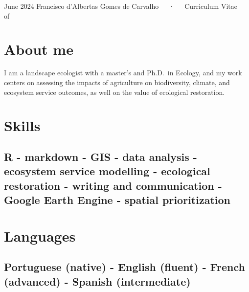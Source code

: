 \documentclass[11pt,a4paper,]{awesome-cv}
\begin{document}
\makecvheader

\makecvfooter
  {June 2024}
    {Francisco d'Albertas Gomes de Carvalho~~~·~~~Curriculum Vitae}
  {\thepage~ of \pageref{LastPage}~}





\section{About me}\label{about-me}

I am a landscape ecologist with a master's and Ph.D.~in Ecology, and my
work centers on assessing the impacts of agriculture on biodiversity,
climate, and ecosystem service outcomes, as well on the value of
ecological restoration.

\section{Skills}\label{skills}

\subsection{R - markdown - GIS - data analysis - ecosystem service
modelling - ecological restoration - writing and communication - Google
Earth Engine - spatial
prioritization}\label{r---markdown---gis---data-analysis---ecosystem-service-modelling---ecological-restoration---writing-and-communication---google-earth-engine---spatial-prioritization}

\section{Languages}\label{languages}

\subsection{Portuguese (native) - English (fluent) - French (advanced) -
Spanish
(intermediate)}\label{portuguese-native---english-fluent---french-advanced---spanish-intermediate}
\end{document}
